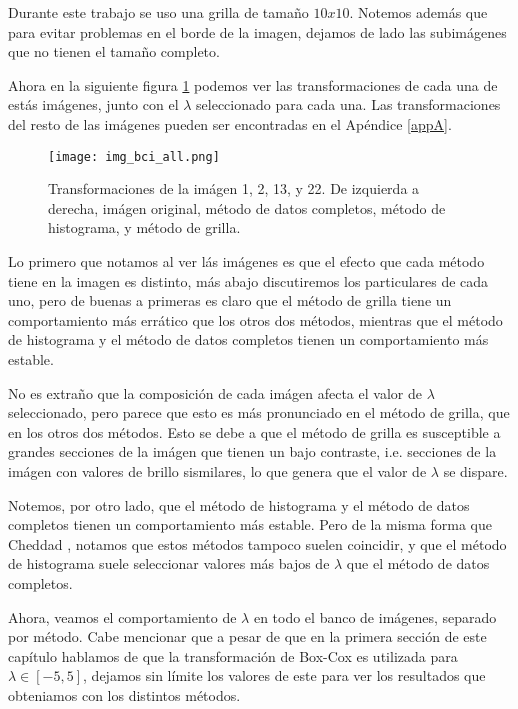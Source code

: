         Durante este trabajo se uso una grilla de tama\~no $10x10$. Notemos adem\'as que para evitar problemas en el borde de la imagen, dejamos de lado las subim\'agenes que no tienen el tama\~no completo.

    Ahora en la siguiente figura \ref{fig:img_bci_all} podemos ver las transformaciones de cada una de est\'as im\'agenes, junto con el $\lambda$ seleccionado para cada una. Las transformaciones del resto de las im\'agenes pueden ser encontradas en el Ap\'endice \ref{appA}.


    \begin{figure}[H]
        \centering
        \texttt{[image: img\_bci\_all.png]}
        \caption{Transformaciones de la im\'agen 1, 2, 13, y 22. De izquierda a derecha, im\'agen original, m\'etodo de datos completos, m\'etodo de histograma, y m\'etodo de grilla.}
        \label{fig:img_bci_all}
    \end{figure}


    Lo primero que notamos al ver l\'as im\'agenes es que el efecto que cada m\'etodo tiene en la imagen es distinto, m\'as abajo discutiremos los particulares de cada uno, pero de buenas a primeras es claro que el m\'etodo de grilla tiene un comportamiento m\'as err\'atico que los otros dos m\'etodos, mientras que el m\'etodo de histograma y el m\'etodo de datos completos tienen un comportamiento m\'as estable.

    No es extra\~no que la composici\'on de cada im\'agen afecta el valor de $\lambda$ seleccionado, pero parece que esto es m\'as pronunciado en el m\'etodo de grilla, que en los otros dos m\'etodos. Esto se debe a que el m\'etodo de grilla es susceptible a grandes secciones de la im\'agen que tienen un bajo contraste, i.e. secciones de la im\'agen con valores de brillo sismilares, lo que genera que el valor de $\lambda$ se dispare. 

    Notemos, por otro lado, que el m\'etodo de histograma y el m\'etodo de datos completos tienen un comportamiento m\'as estable. Pero de la misma forma que Cheddad \cite{boxcoximg}, notamos que estos m\'etodos tampoco suelen coincidir, y que el m\'etodo de histograma suele seleccionar valores m\'as bajos de $\lambda$ que el m\'etodo de datos completos.
    
    Ahora, veamos el comportamiento de $\lambda$ en todo el banco de im\'agenes, separado por m\'etodo. Cabe mencionar que a pesar de que  en la primera secci\'on de este cap\'itulo hablamos de que la transformaci\'on de Box-Cox es utilizada para $\lambda\in[-5,5]$, dejamos sin l\'imite los valores de este para ver los resultados que obteniamos con los distintos m\'etodos.

